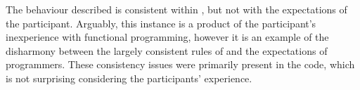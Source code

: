 The behaviour described is consistent within \fs, but not with the expectations of the participant. Arguably, this instance is a product of the participant's inexperience with functional programming, however it is an example of the disharmony between the largely consistent rules of \fs and the expectations of programmers. These consistency issues were primarily present in the \fs code, which is not surprising considering the participants' experience.
